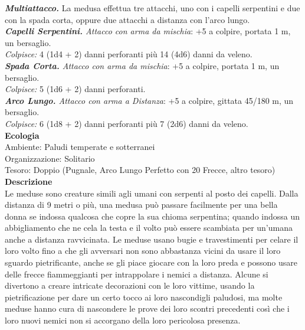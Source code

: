 \begin{multicols}{2}
\emph{\textbf{Multiattacco.}} La medusa effettua tre attacchi, uno con i capelli serpentini e due con la spada corta, oppure due attacchi a distanza con l'arco lungo.\\
\emph{\textbf{Capelli Serpentini.} Attacco con arma da mischia}: +5 a colpire, portata 1 m, un bersaglio.\\
\emph{Colpisce:} 4 (1d4 + 2) danni perforanti più 14 (4d6) danni da veleno.\\
\emph{\textbf{Spada Corta.} Attacco con arma da mischia}: +5 a colpire, portata 1 m, un bersaglio.\\
\emph{Colpisce:} 5 (1d6 + 2) danni perforanti.\\
\emph{\textbf{Arco Lungo.} Attacco con arma a Distanza}: +5 a colpire, gittata 45/180 m, un bersaglio.\\
\emph{Colpisce:} 6 (1d8 + 2) danni perforanti più 7 (2d6) danni da veleno.\\
\textbf{Ecologia}\\
Ambiente: Paludi temperate e sotterranei\\
Organizzazione: Solitario\\
Tesoro: Doppio (Pugnale, Arco Lungo Perfetto con 20 Frecce, altro tesoro)\\
\textbf{Descrizione}\\
Le meduse sono creature simili agli umani con serpenti al posto dei capelli. Dalla distanza di 9 metri o più, una medusa può passare facilmente per una bella donna se indossa qualcosa che copre la sua chioma serpentina; quando indossa un abbigliamento che ne cela la testa e il volto può essere scambiata per un’umana anche a distanza ravvicinata. Le meduse usano bugie e travestimenti per celare il loro volto fino a che gli avversari non sono abbastanza vicini da usare il loro sguardo pietrificante, anche se gli piace giocare con la loro preda e possono usare delle frecce fiammeggianti per intrappolare i nemici a distanza. Alcune si divertono a creare intricate decorazioni con le loro vittime, usando la pietrificazione per dare un certo tocco ai loro nascondigli paludosi, ma molte meduse hanno cura di nascondere le prove dei loro scontri precedenti così che i loro nuovi nemici non si accorgano della loro pericolosa presenza.\\


\end{multicols}

